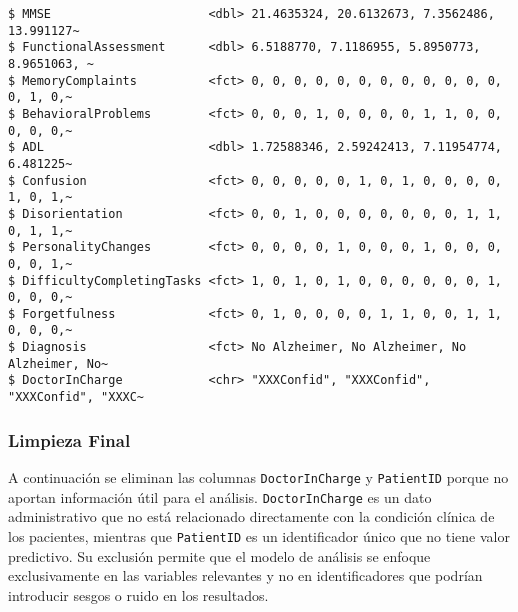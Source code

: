 \documentclass[
  letterpaper,
  DIV=11,
  numbers=noendperiod]{scrartcl}
\begin{document}
\begin{verbatim}
$ MMSE                      <dbl> 21.4635324, 20.6132673, 7.3562486, 13.991127~
$ FunctionalAssessment      <dbl> 6.5188770, 7.1186955, 5.8950773, 8.9651063, ~
$ MemoryComplaints          <fct> 0, 0, 0, 0, 0, 0, 0, 0, 0, 0, 0, 0, 0, 1, 0,~
$ BehavioralProblems        <fct> 0, 0, 0, 1, 0, 0, 0, 0, 1, 1, 0, 0, 0, 0, 0,~
$ ADL                       <dbl> 1.72588346, 2.59242413, 7.11954774, 6.481225~
$ Confusion                 <fct> 0, 0, 0, 0, 0, 1, 0, 1, 0, 0, 0, 0, 1, 0, 1,~
$ Disorientation            <fct> 0, 0, 1, 0, 0, 0, 0, 0, 0, 0, 1, 1, 0, 1, 1,~
$ PersonalityChanges        <fct> 0, 0, 0, 0, 1, 0, 0, 0, 1, 0, 0, 0, 0, 0, 1,~
$ DifficultyCompletingTasks <fct> 1, 0, 1, 0, 1, 0, 0, 0, 0, 0, 0, 1, 0, 0, 0,~
$ Forgetfulness             <fct> 0, 1, 0, 0, 0, 0, 1, 1, 0, 0, 1, 1, 0, 0, 0,~
$ Diagnosis                 <fct> No Alzheimer, No Alzheimer, No Alzheimer, No~
$ DoctorInCharge            <chr> "XXXConfid", "XXXConfid", "XXXConfid", "XXXC~
\end{verbatim}

\subsubsection{Limpieza Final}\label{limpieza-final}

A continuación se eliminan las columnas \texttt{DoctorInCharge} y
\texttt{PatientID} porque no aportan información útil para el análisis.
\texttt{DoctorInCharge} es un dato administrativo que no está
relacionado directamente con la condición clínica de los pacientes,
mientras que \texttt{PatientID} es un identificador único que no tiene
valor predictivo. Su exclusión permite que el modelo de análisis se
enfoque exclusivamente en las variables relevantes y no en
identificadores que podrían introducir sesgos o ruido en los resultados.
\end{document}
